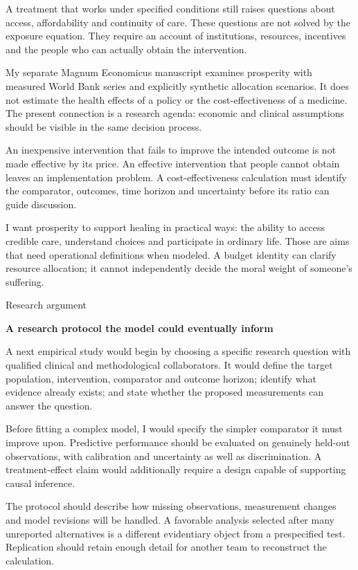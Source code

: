 \documentclass[10pt]{article}
\begin{document}
A treatment that works under specified conditions still raises questions about access, affordability and continuity of care. These questions are not solved by the exposure equation. They require an account of institutions, resources, incentives and the people who can actually obtain the intervention.\par
My separate Magnum Economicus manuscript examines prosperity with measured World Bank series and explicitly synthetic allocation scenarios. It does not estimate the health effects of a policy or the cost-effectiveness of a medicine. The present connection is a research agenda: economic and clinical assumptions should be visible in the same decision process.\par
An inexpensive intervention that fails to improve the intended outcome is not made effective by its price. An effective intervention that people cannot obtain leaves an implementation problem. A cost-effectiveness calculation must identify the comparator, outcomes, time horizon and uncertainty before its ratio can guide discussion.\par
I want prosperity to support healing in practical ways: the ability to access credible care, understand choices and participate in ordinary life. Those are aims that need operational definitions when modeled. A budget identity can clarify resource allocation; it cannot independently decide the moral weight of someone's suffering.\par
\clearpage
{\small\color{accent}Research argument}\par
{\LARGE\bfseries\color{ink}A research protocol the model could eventually inform}\par\vspace{7pt}
A next empirical study would begin by choosing a specific research question with qualified clinical and methodological collaborators. It would define the target population, intervention, comparator and outcome horizon; identify what evidence already exists; and state whether the proposed measurements can answer the question.\par
Before fitting a complex model, I would specify the simpler comparator it must improve upon. Predictive performance should be evaluated on genuinely held-out observations, with calibration and uncertainty as well as discrimination. A treatment-effect claim would additionally require a design capable of supporting causal inference.\par
The protocol should describe how missing observations, measurement changes and model revisions will be handled. A favorable analysis selected after many unreported alternatives is a different evidentiary object from a prespecified test. Replication should retain enough detail for another team to reconstruct the calculation.\par
\end{document}

